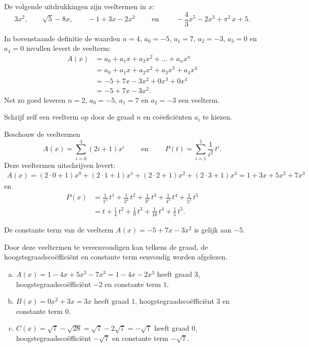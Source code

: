 \documentclass{ximera}
\begin{document}
\begin{example} 
De volgende uitdrukkingen zijn veeltermen in $x$:
\[
3x^2, 
\qquad \sqrt{5} - 8x, 
\qquad -1 + 3x -2x^2 
\qquad \text{ en } \qquad -\frac{4}{3}x^5 - 2x^3 + \pi^2\,x + 5. 
\]      
\end{example} 
    

\begin{example} 
In bovenstaande definitie de waarden $n = 4$, $a_0 = -5$, $a_1 = 7$, $a_2 = -3$, $a_3 = 0$ en $a_4 = 0$ invullen levert de veelterm: 
\begin{align*}
A(x) 
& = a_0 + a_1x + a_2x^2 + \dots + a_n x^n \\
& = a_0 + a_1x + a_2x^2 + a_3 x^3 + a_4 x^4 \\ 
& = -5 + 7x - 3x^2 + 0x^3 + 0x^4 \\
& = -5 + 7x - 3x^2.
\end{align*}
Net zo goed leveren $n = 2$, $a_0 = -5$, $a_1 = 7$ en $a_2 = -3$ een veelterm.
\end{example} 

\begin{exercise}
Schrijf zelf een veelterm op door de graad \(n\) en coëeficiënten \(a_i\) te kiezen.
\end{exercise}

\begin{example} 
Beschouw de veeltermen
\[
A(x) = \sum_{i=0}^3 (2i+1) x^i \qquad \text{ en } \qquad P(t) = \sum_{i=1}^5 \frac{1}{i^2} \, t^i.
\] 
Deze veeltermen uitschrijven levert: 
\begin{align*}
A(x)  = (2\cdot0+1)x^0 + (2\cdot1+1)x^1 + (2\cdot2+1)x^2 + (2\cdot3+1)x^3 = 1 + 3x + 5x^2 + 7x^3
\end{align*}
en
\begin{align*}
P(x) 
& = \frac{1}{1^2} \, t^1 + \frac{1}{2^2} \, t^2 + \frac{1}{3^2} \, t^3 + \frac{1}{4^2} \, t^4 + \frac{1}{5^2} \, t^5 \\
& = t + \frac{1}{4}\,t^2 + \frac{1}{9}\,t^3 + \frac{1}{16}\,t^4 + \frac{1}{5}\,t^5.
\end{align*}
\end{example} 



\begin{example} 
De constante term van de veelterm $A(x) = -5 + 7x - 3x^2$ is gelijk aan $-5$.  
\end{example} 


\begin{example} 
Door deze veeltermen te vereenvoudigen kan telkens de graad, de hoogstegraadscoëfficiënt en constante term eenvoudig worden afgelezen. 
\begin{enumerate}[(a)]
\item
$A(x) = 1-4x+5x^3-7x^3 = 1 - 4x - 2x^3$ heeft graad $3$, hoogstegraadscoëfficiënt $-2$ en constante term $1$.
\item
$B(x) = 0x^2 + 3x = 3x$ heeft graad $1$, hoogstegraadscoëfficiënt $3$ en constante term $0$.
\item
$C(x) = \sqrt{7}-\sqrt{28} = \sqrt{7}-2\sqrt{7} = -\sqrt{7}$ heeft graad $0$, hoogstegraadscoëfficiënt $-\sqrt{7}$ en constante term $-\sqrt{7}$.
\end{enumerate}
\end{example} 
\end{document}
